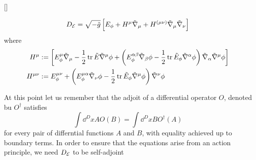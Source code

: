 []


\begin{equation}\label{DE}
  D_{\mathcal{E}} =\sqrt{-\tilde{g}}\left[E_\phi +H^\mu\tilde{\nabla}_\mu +H^{(\mu\nu )}\tilde{\nabla}_\mu\tilde{\nabla}_\nu \right]
\end{equation}
where
\begin{align}
  H^\mu &:=\left[E^\mu_\phi \tilde{\nabla}_\mu-\frac{1}{2}\tr\tilde{E}\tilde{\nabla}^\mu\phi +\left(E^{\alpha\beta }_\phi\tilde{\nabla}_\beta \phi -\frac{1}{2}\tr \tilde{E}_\phi\tilde{\nabla}^\alpha\phi \right)\tilde{\nabla}_\alpha\tilde{\nabla}^\mu\phi \right]\\
  H^{\mu\nu }&:=E^{\mu\nu }_\phi+\left(E^{\mu\alpha }_\phi \tilde{\nabla}_\nu\phi-\frac{1}{2}\tr\tilde{E}_\phi\tilde{\nabla}^\mu\phi \right)\tilde{\nabla}^\nu\phi 
\end{align}



At this point let us remember that the adjoit of a differential operator $O$, denoted bu $O^\dagger$  satisfies
\begin{equation}
	\int\dd^Dx AO(B)=\int\dd ^DxBO^\dagger(A)
\end{equation}
for every pair of differntial functions $A$ and $B$, with equality achieved up to boundary terms.
In order to ensure that the equations arise from an action principle, we need $D_{\mathcal{E}} $ to be self-adjoint

